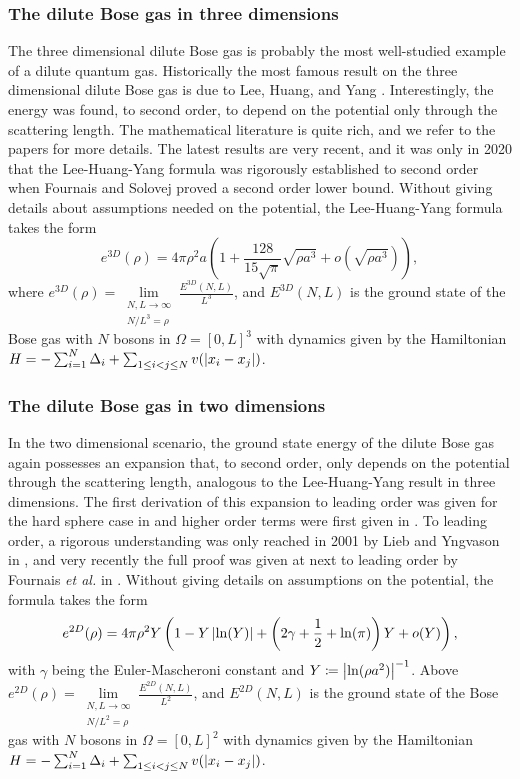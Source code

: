 \subsubsection{The dilute Bose gas in three dimensions}
The three dimensional dilute Bose gas is probably the most well-studied example of a dilute quantum gas. Historically the most famous result on the three dimensional dilute Bose gas is due to Lee, Huang, and Yang \cite{lee1957eigenvalues}. Interestingly, the energy was found, to second order, to depend on the potential only through the scattering length.
The mathematical literature is quite rich, and we refer to the papers \cite{dyson1957ground,lieb1998ground,lieb1999ground,lieb2001ground,yau2009second,fournais2020energy,fournais2021energy,basti2021new} for more details. The latest results are very recent, and it was only in 2020 that the Lee-Huang-Yang formula was rigorously established to second order when Fournais and Solovej proved a second order lower bound. Without giving details about assumptions needed on the potential, the Lee-Huang-Yang formula takes the form \begin{equation}
e^{3D}(\rho)=4\pi \rho^2 a\left(1+\frac{128}{15\sqrt{\pi}}\sqrt{\rho a^3}+o\left(\sqrt{\rho a^3}\right)\right),
\end{equation}
where $ e^{3D}(\rho)=\lim\limits_{\substack{N,L\to\infty\\ N/L^3=\rho}}\frac{E^{3D}(N,L)}{L^3} $, and $ E^{3D}(N,L) $ is the ground state of the Bose gas with $ N $ bosons in $ \Omega=[0,L]^3 $ with dynamics given by the Hamiltonian $ H=-\sum_{i=1}^{N}\Delta_i+\sum_{1\leq i<j\leq N} v(\left\lvert x_i-x_j \right\rvert) $.

\subsubsection{The dilute Bose gas in two dimensions}
In the two dimensional scenario, the ground state energy of the dilute Bose gas again possesses an expansion that, to second order, only depends on the potential through the scattering length, analogous to the Lee-Huang-Yang result in three dimensions. The first derivation of this expansion to leading order was given for the hard sphere case in \cite{schick1971two} and higher order terms were first given in \cite{hines1978hard}. To leading order, a rigorous understanding was only reached in 2001 by Lieb and Yngvason in \cite{lieb2001ground}, and very recently the full proof was given at next to leading order by Fournais \emph{et al.} in \cite{fournais2022ground}. Without giving details on assumptions on the potential, the formula takes the form
\begin{equation}
e^{2D}(\rho)=4\pi \rho^2 Y\left(1-Y\left\lvert \ln(Y) \right\rvert+\left(2\gamma+\frac{1}{2}+\ln(\pi)\right)Y+o(Y)\right),
\end{equation}
with $ \gamma $ being the Euler-Mascheroni constant and $ Y\coloneqq\left\lvert \ln(\rho a^2) \right\rvert^{-1} $. Above $ e^{2D}(\rho)=\lim\limits_{\substack{N,L\to\infty\\ N/L^2=\rho}}\frac{E^{2D}(N,L)}{L^2} $, and $ E^{2D}(N,L) $ is the ground state of the Bose gas with $ N $ bosons in $ \Omega=[0,L]^2 $ with dynamics given by the Hamiltonian $ H=-\sum_{i=1}^{N}\Delta_i+\sum_{1\leq i<j\leq N} v(\left\lvert x_i-x_j \right\rvert) $.
